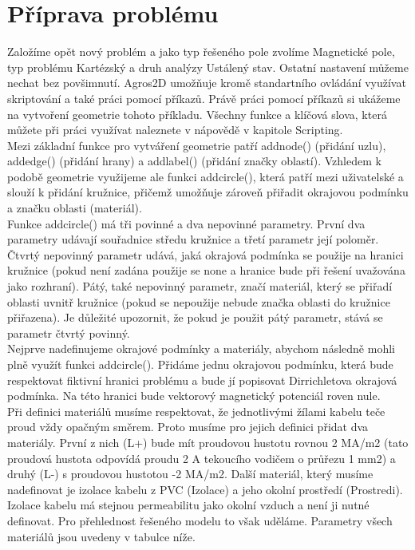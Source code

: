 \documentclass[a4paper, oneside]{article}
\begin{document}
\section{Příprava problému}
Založíme opět nový problém a jako typ řešeného pole zvolíme Magnetické pole, typ problému Kartézský a druh analýzy Ustálený stav. Ostatní nastavení můžeme nechat bez povšimnutí. Agros2D umožňuje kromě standartního ovládání využívat skriptování a také práci pomocí příkazů. Právě práci pomocí příkazů si ukážeme na vytvoření geometrie tohoto příkladu. Všechny funkce a klíčová slova, která můžete při práci využívat naleznete v nápovědě v kapitole Scripting.\\
Mezi základní funkce pro vytváření geometrie patří addnode() (přidání uzlu), addedge() (přidání hrany) a addlabel() (přidání značky oblastí). Vzhledem k podobě geometrie využijeme ale funkci addcircle(), která patří mezi uživatelské a slouží k přidání kružnice, přičemž umožňuje zároveň přiřadit okrajovou podmínku a značku oblasti (materiál).\\
Funkce addcircle() má tři povinné a dva nepovinné parametry. První dva parametry udávají souřadnice středu kružnice a třetí parametr její poloměr. Čtvrtý nepovinný parametr udává, jaká okrajová podmínka se použije na hranici kružnice (pokud není zadána použije se none a hranice bude při řešení uvažována jako rozhraní). Pátý, také nepovinný parametr, značí materiál, který se přiřadí oblasti uvnitř kružnice (pokud se nepoužije nebude značka oblasti do kružnice přiřazena). Je důležité upozornit, že pokud je použit pátý parametr, stává se parametr čtvrtý povinný.\\
Nejprve nadefinujeme okrajové podmínky a materiály, abychom následně mohli plně využít funkci addcircle(). Přidáme jednu okrajovou podmínku, která bude respektovat fiktivní hranici problému a bude jí popisovat Dirrichletova okrajová podmínka. Na této hranici bude vektorový magnetický potenciál roven nule.\\
Při definici materiálů musíme respektovat, že jednotlivými žílami kabelu teče proud vždy opačným směrem. Proto musíme pro jejich definici přidat dva materiály. První z nich (L+) bude mít proudovou hustotu rovnou 2 MA/m2 (tato proudová hustota odpovídá proudu 2 A tekoucího vodičem o průřezu 1 mm2) a druhý (L-) s proudovou hustotou -2 MA/m2. Další materiál, který musíme nadefinovat je izolace kabelu z PVC (Izolace) a jeho okolní prostředí (Prostredi). Izolace kabelu má stejnou permeabilitu jako okolní vzduch a není ji nutné definovat. Pro přehlednost řešeného modelu to však uděláme. Parametry všech materiálů jsou uvedeny v tabulce níže.\\
\end{document}
